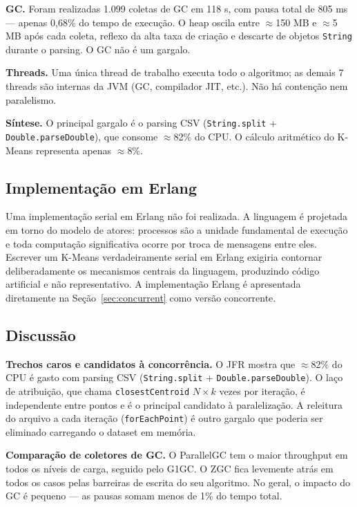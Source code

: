 \textbf{GC.}
Foram realizadas 1.099 coletas de GC em 118 s, com pausa total de 805 ms ---
apenas 0,68\% do tempo de execução. O heap oscila entre $\approx$150 MB e
$\approx$5 MB após cada coleta, reflexo da alta taxa de criação e descarte de
objetos \texttt{String} durante o parsing. O GC não é um gargalo.

\textbf{Threads.}
Uma única thread de trabalho executa todo o algoritmo; as demais 7 threads
são internas da JVM (GC, compilador JIT, etc.). Não há contenção nem
paralelismo.

\textbf{Síntese.}
O principal gargalo é o parsing CSV (\texttt{String.split} + \texttt{Double.parseDouble}),
que consome $\approx$82\% do CPU. O cálculo aritmético do K-Means representa apenas $\approx$8\%.

\subsection{Implementação em Erlang}

Uma implementação serial em Erlang não foi realizada. A linguagem é projetada
em torno do modelo de atores: processos são a unidade fundamental de execução
e toda computação significativa ocorre por troca de mensagens entre eles.
Escrever um K-Means verdadeiramente serial em Erlang exigiria contornar
deliberadamente os mecanismos centrais da linguagem, produzindo código
artificial e não representativo. A implementação Erlang é apresentada
diretamente na Seção~\ref{sec:concurrent} como versão concorrente.

\subsection{Discussão}

\textbf{Trechos caros e candidatos à concorrência.}
O JFR mostra que $\approx$82\% do CPU é gasto com parsing CSV
(\texttt{String.split} + \texttt{Double.parseDouble}). O laço de atribuição,
que chama \texttt{closestCentroid} $N \times k$ vezes por iteração, é
independente entre pontos e é o principal candidato à paralelização. A
releitura do arquivo a cada iteração (\texttt{forEachPoint}) é outro gargalo
que poderia ser eliminado carregando o dataset em memória.

\textbf{Comparação de coletores de GC.}
O ParallelGC tem o maior throughput em todos os níveis de carga, seguido pelo G1GC.
O ZGC fica levemente atrás em todos os casos pelas barreiras de escrita do seu
algoritmo. No geral, o impacto do GC é pequeno --- as pausas somam menos de 1\%
do tempo total.

